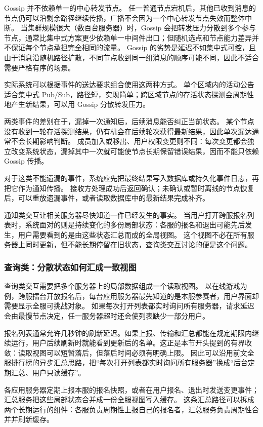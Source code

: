 Gossip 并不依赖单一的中心转发节点。
任一普通节点宕机后，其他已收到消息的节点仍可以沿剩余路径继续传播，广播不会因为一个中心转发节点失效而整体中断。
当集群规模很大（数百台服务器）时，Gossip 会把转发压力分散到多个参与节点，通常比集中式方案更少依赖单一中间件出口；但随机选点和节点能力差异并不保证每个节点承担完全相同的流量。
Gossip 的劣势是延迟不如集中式可控，且由于消息沿随机路径扩散，不同节点收到同一组消息的顺序可能不同，因此不适合需要严格有序的场景。

实际系统可以根据事件的送达要求组合使用这两种方式。
单个区域内的活动公告适合集中式 Pub/Sub，路径短，实现简单；跨区域节点的存活状态探测会周期性地产生新结果，可以用 Gossip 分散转发压力。

两类事件的差别在于，漏掉一次通知后，后续消息能否纠正当前状态。
某个节点没有收到一轮存活探测结果，仍有机会在后续轮次获得最新结果，因此单次漏达通常不会长期影响判断。
成员加入或移出、用户权限变更则不同：每次变更都会独立改变系统状态，漏掉其中一次就可能使节点长期保留错误结果，因而不能只依赖 Gossip 传播。

对于这类不能遗漏的事件，系统应先把最终结果写入数据库或持久化事件日志，再把它作为通知传播。
接收方处理成功后返回确认；未确认或暂时离线的节点恢复后，可以重放遗漏事件，或者读取数据库中的最新结果完成补齐。

通知类交互让相关服务器尽快知道一件已经发生的事实。
当用户打开跨服报名列表时，系统面对的则是持续变化的多份局部状态：各服的报名和退出可能先后发生，用户需要看到的是由这些状态汇总而成的全局视图。
这个视图不必在所有服务器上同时更新，但不能长期停留在旧状态，查询类交互讨论的便是这个问题。

\subsubsection{查询类：分散状态如何汇成一致视图}\label{sec4:global-state-registration-query}

查询类交互需要把多个服务器上的局部数据组成一个读取视图。
以在线游戏为例，跨服擂台开放报名后，每台应用服务器最先知道的是本服参赛者，用户界面却需要显示全服可挑战对象。
如果每次打开列表都实时询问所有服务器，请求延迟会由最慢节点决定，任一服务器超时还会使列表缺少一部分用户。

报名列表通常允许几秒钟的刷新延迟。如果上报、传输和汇总都能在规定期限内继续运行，用户后续刷新时就能看到更新后的名单。这正是本节开头提到的有界收敛：读取视图可以短暂落后，但落后时间必须有明确上限。
因此可以沿用前文全服排行榜的异步汇总思路，把“每次打开列表都实时询问所有服务器”换成“后台定期汇总、用户只读缓存”。

各应用服务器定期上报本服的报名快照，或者在用户报名、退出时发送变更事件；汇总服务把这些局部状态合并成一份全服视图写入缓存。
这条汇总路径可以拆成两个长期运行的组件：各服负责周期性上报自己的报名者，汇总服务负责周期性合并并刷新缓存。

